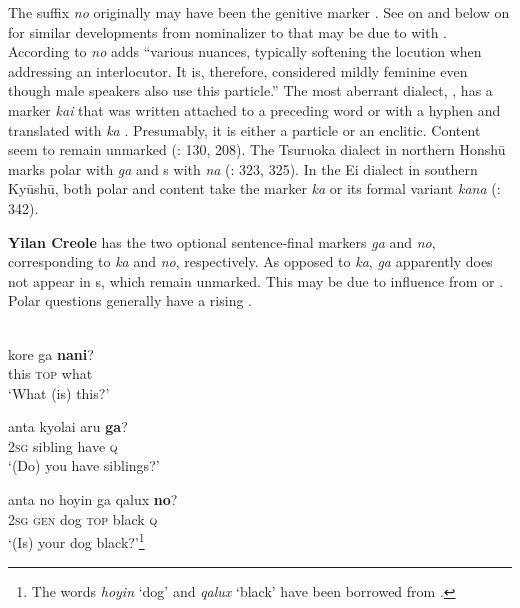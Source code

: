 The suffix \textit{no} originally may have been the genitive  marker \citep[258]{Shibatani1990}. See  on  and below on  for similar developments from nominalizer to  that may be due to  with . According to \citet[297]{Hasegawa2015} \textit{no} adds “various nuances, typically softening the locution when addressing an interlocutor. It is, therefore, considered mildly feminine even though male speakers also use this particle.” The most aberrant  dialect, \textit{}, has a marker \textit{kai} that was written attached to a preceding word or with a hyphen and translated with  \textit{ka} . Presumably, it is either a particle or an enclitic. Content  seem to remain unmarked (\citealt{KKK1950}: 130, 208). The Tsuruoka dialect in northern Honshū marks polar  with \textit{ga} and s with \textit{na} (\citealt{Matsumori2012}: 323, 325). In the Ei dialect in southern Kyūshū, both polar and content  take the marker \textit{ka} or its formal variant \textit{kana} (\citealt{Matsumori2012}: 342).

\textbf{Yilan Creole} has the two optional sentence-final markers \textit{ga} and \textit{no}, corresponding to  \textit{ka} and \textit{no}, respectively. As opposed to  \textit{ka}, \textit{ga} apparently does not appear in s, which remain unmarked. This may be due to influence from  or . Polar questions generally have a rising .

\ea%
    \label{ex:japa:9}
    \\
    \ea
    \gll kore ga \textbf{{nani}}?\\
    this  \textsc{top} what\\
    \glt ‘What (is) this?’
    
    \ex
    \gll anta kyolai aru \textbf{{ga}}?\\
    2\textsc{sg}  sibling have  \textsc{q}\\
    \glt ‘(Do) you have siblings?’
    
    \ex
    \gll anta no hoyin ga qalux \textbf{{no}}?\\
    2\textsc{sg}  \textsc{gen}  dog  \textsc{top}  black  \textsc{q}\\
    \glt ‘(Is) your dog black?’\footnote{The words \textit{hoyin} ‘dog’ and \textit{qalux} ‘black’ have been borrowed from .}
    
